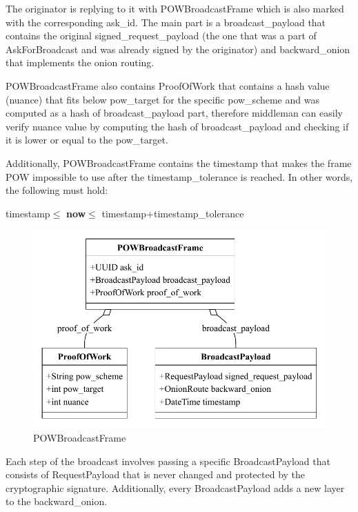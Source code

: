 \documentclass{article}
\begin{document}
The originator is replying to it with POWBroadcastFrame which is also marked with the corresponding ask\_id. The main part is a broadcast\_payload that contains the original signed\_request\_payload (the one that was a part of AskForBroadcast and was already signed by the originator) and backward\_onion that implements the onion routing.

POWBroadcastFrame also contains ProofOfWork that contains a hash value (nuance) that fits below pow\_target for the specific pow\_scheme and was computed as a hash of broadcast\_payload part, therefore middleman can easily verify nuance value by computing the hash of broadcast\_payload and checking if it is lower or equal to the pow\_target. 

Additionally, POWBroadcastFrame contains the timestamp that makes the frame POW impossible to use after the timestamp\_tolerance is reached. In other words, the following must hold:

\begin{center}
	timestamp$\le$ \textbf{now}$\le$ timestamp+timestamp\_tolerance
\end{center}

\begin{figure}
	\centering
	\includegraphics[scale=0.7]{POWBroadcastFrame.pdf}
	\caption{POWBroadcastFrame}
	\label{fig:fr:powbroadcastframe}
\end{figure}

Each step of the broadcast involves passing a specific BroadcastPayload that consists of RequestPayload that is never changed and protected by the cryptographic signature.  Additionally, every BroadcastPayload adds a new layer to the backward\_onion.
\end{document}
